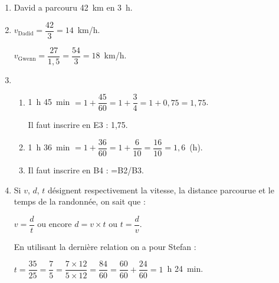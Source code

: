 \begin{enumerate}
\item %
David a parcouru 42~km en 3~h.
\item %
$v_{\text{Dadid}} = \dfrac{42}{3} = 14$~km/h.

$v_{\text{Gwenn}} = \dfrac{27}{1,5} = \dfrac{54}{3} = 18$~km/h.
\item %


	\begin{enumerate}
		\item %
1~h 45~min $ = 1 + \dfrac{45}{60} = 1 + \dfrac{3}{4} = 1 +  0,75 = 1,75$.

Il faut inscrire en E3 : 1,75.

		\item %
1~h 36~min $ = 1 + \dfrac{36}{60} = 1 + \dfrac{6}{10} = \dfrac{16}{10} = 1,6$~(h).
		\item %
		Il faut inscrire en B4 : =B2/B3.
	\end{enumerate}
\item %
	
	
Si $v$, $d$, $t$ désignent respectivement la vitesse, la distance parcourue et le temps de la randonnée, on sait que :

$v = \dfrac{d}{t}$ ou encore $d = v\times t$ ou $t = \dfrac{d}{v}$.

En utilisant la dernière relation on a pour Stefan :

$t = \dfrac{35}{25} = \dfrac{7}{5} = \dfrac{7 \times 12}{5 \times 12} = \dfrac{84}{60} = \dfrac{60}{60} + \dfrac{24}{60} = 1$~h 24~min.
\end{enumerate}

\bigskip

